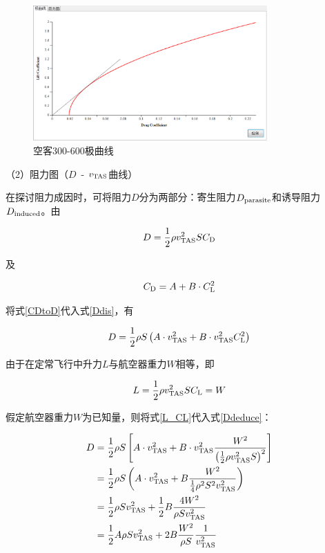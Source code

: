 \documentclass[a4paper,punct,space,heading=true,AutoFakeBold]{ctexrep}
\begin{document}
\begin{figure}[h]
	\centering
	\includegraphics[width=0.8\textwidth]{pic/dragpolar.eps}\hspace{30pt}
	\caption{空客300-600极曲线}\label{dragpolar}
\end{figure}

（2）阻力图（$D$\ - $v_{\rm TAS}$曲线）

在探讨阻力成因时，可将阻力$D$分为两部分：寄生阻力$D_{\rm parasite}$和诱导阻力$D_{\rm induced}$。由

\begin{equation}\label{Ddis}
D=\frac{1}{2}\rho v_{\rm TAS}^2 S C_{\rm D}
\end{equation}

及

\begin{equation}\label{CDtoD}
C_{\rm D}=A+B\cdot C_{\rm L}^2
\end{equation}

将式\ref{CDtoD}代入式\ref{Ddis}，有

\begin{equation}\label{Ddeduce}
D=\frac{1}{2}\rho S\left(A\cdot v_{\rm TAS}^2+B\cdot v_{\rm TAS}^2 C_{\rm L}^2\right)
\end{equation}

由于在定常飞行中升力$L$与航空器重力$W$相等，即

\begin{equation}\label{L_CL}
L=\frac{1}{2}\rho v_{\rm TAS}^2 S C_{\rm L}=W
\end{equation}

假定航空器重力$W$为已知量，则将式\ref{L_CL}代入式\ref{Ddeduce}：

\begin{equation}
\begin{split}
D&=\frac{1}{2}\rho S\left[A\cdot v_{\rm TAS}^2+B\cdot v_{\rm TAS}^2\frac{W^2}{\left(\frac{1}{2}\rho v_{\rm TAS}^2 S\right)^2}\right]\\
&=\frac{1}{2}\rho S\left(A\cdot v_{\rm TAS}^2+B\frac{W^2}{\frac{1}{4}\rho^2 S^2 v_{\rm TAS}^2}\right)\\
&=\frac{1}{2}\rho S v_{\rm TAS}^2+\frac{1}{2}B\frac{4W^2}{\rho S v_{\rm TAS}^2}\\
&=\frac{1}{2}A\rho S v_{\rm TAS}^2+2B\frac{W^2}{\rho S}\frac{1}{v_{\rm TAS}^2}
\end{split}
\end{equation}
\end{document}
